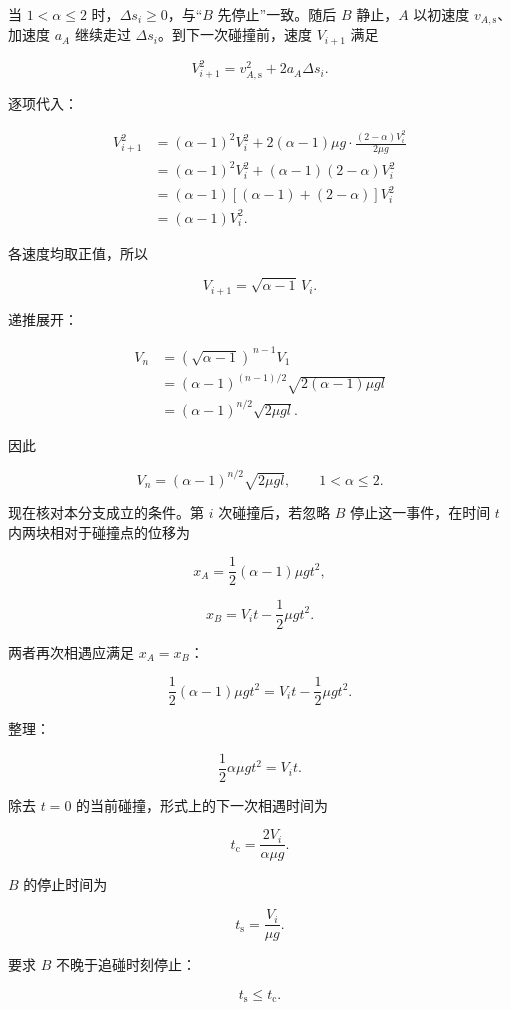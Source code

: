 \documentclass[12pt,a4paper,UTF8]{ctexart}
\begin{document}
当 \(1<\alpha\leq2\) 时，\(\Delta s_i\geq0\)，与``\(B\)
先停止''一致。随后 \(B\) 静止，\(A\) 以初速度
\(v_{A,\mathrm s}\)、加速度 \(a_A\) 继续走过
\(\Delta s_i\)。到下一次碰撞前，速度 \(V_{i+1}\) 满足

\[V_{i+1}^2
=v_{A,\mathrm s}^2+2a_A\Delta s_i.\]

逐项代入：

\[\begin{aligned}
V_{i+1}^2
&=(\alpha-1)^2V_i^2
+2(\alpha-1)\mu g
\cdot\frac{(2-\alpha)V_i^2}{2\mu g}\\
&=(\alpha-1)^2V_i^2
+(\alpha-1)(2-\alpha)V_i^2\\
&=(\alpha-1)
\left[(\alpha-1)+(2-\alpha)\right]V_i^2\\
&=(\alpha-1)V_i^2.
\end{aligned}\]

各速度均取正值，所以

\[V_{i+1}=\sqrt{\alpha-1}\,V_i.\]

递推展开：

\[\begin{aligned}
V_n
&=(\sqrt{\alpha-1})^{\,n-1}V_1\\
&=(\alpha-1)^{(n-1)/2}
\sqrt{2(\alpha-1)\mu gl}\\
&=(\alpha-1)^{n/2}\sqrt{2\mu gl}.
\end{aligned}\]

因此

\[\boxed{
V_n=(\alpha-1)^{n/2}\sqrt{2\mu gl},
\qquad 1<\alpha\leq2
}.\]

现在核对本分支成立的条件。第 \(i\) 次碰撞后，若忽略 \(B\)
停止这一事件，在时间 \(t\) 内两块相对于碰撞点的位移为

\[x_A=\frac12(\alpha-1)\mu gt^2,\]

\[x_B=V_it-\frac12\mu gt^2.\]

两者再次相遇应满足 \(x_A=x_B\)：

\[\frac12(\alpha-1)\mu gt^2
=V_it-\frac12\mu gt^2.\]

整理：

\[\frac12\alpha\mu gt^2=V_it.\]

除去 \(t=0\) 的当前碰撞，形式上的下一次相遇时间为

\[t_{\mathrm c}=\frac{2V_i}{\alpha\mu g}.\]

\(B\) 的停止时间为

\[t_{\mathrm s}=\frac{V_i}{\mu g}.\]

要求 \(B\) 不晚于追碰时刻停止：

\[t_{\mathrm s}\leq t_{\mathrm c}.\]
\end{document}
